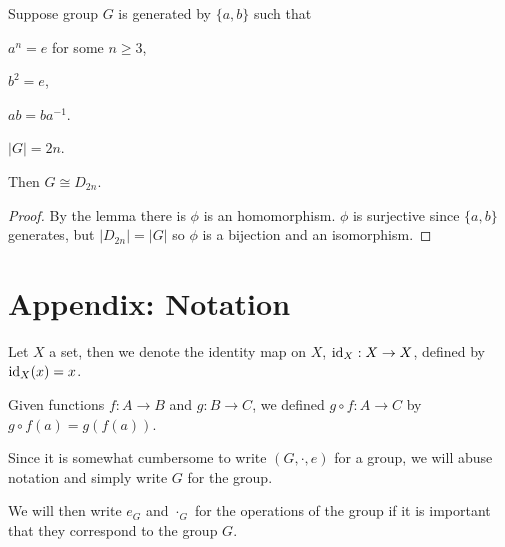 \documentclass[12pt]{article}
\begin{document}
\begin{prop}
    Suppose group $G$ is generated by $\{a,b\}$ such that
    \begin{compactenum}[(i)]
    \item $a^{n} = e$ for some $n \ge 3$,
    \item $b^{2} = e$,
    \item $ab = ba^{-1}$.
    \item $|G| = 2n$.
    \end{compactenum}
    Then $G \cong D_{2n}$.
\end{prop}
\begin{proof}
    By the lemma there is $\phi$ is an homomorphism.
    $\phi$ is surjective since $\{a,b\}$ generates,
    but $|D_{2n}| = |G|$ so $\phi$ is a bijection
    and an isomorphism.
\end{proof}

\appendix
\newpage

\section{Appendix: Notation}
Let $X$ a set, then we denote the identity map on $X$,
$\operatorname{id}_{X} : X \to X$, defined by $\operatorname{id}_{X}(x) = x$.

Given functions $f:A\to B$ and $g:B\to C$,
we defined $g\circ f:A\to C$ by $g\circ f(a) = g(f(a))$.

Since it is somewhat cumbersome to write $(G,\cdot,e)$
for a group, we will abuse notation and simply write $G$ for the group.

We will then write $e_{G}$ and $\cdot_{G}$ for the operations of the group
if it is important that they correspond to the group $G$.
\end{document}
